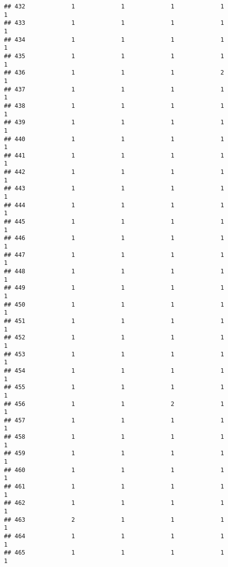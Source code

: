 \documentclass[
]{article}
\begin{document}
\begin{verbatim}
## 432             1             1             1             1             1
## 433             1             1             1             1             1
## 434             1             1             1             1             1
## 435             1             1             1             1             1
## 436             1             1             1             2             1
## 437             1             1             1             1             1
## 438             1             1             1             1             1
## 439             1             1             1             1             1
## 440             1             1             1             1             1
## 441             1             1             1             1             1
## 442             1             1             1             1             1
## 443             1             1             1             1             1
## 444             1             1             1             1             1
## 445             1             1             1             1             1
## 446             1             1             1             1             1
## 447             1             1             1             1             1
## 448             1             1             1             1             1
## 449             1             1             1             1             1
## 450             1             1             1             1             1
## 451             1             1             1             1             1
## 452             1             1             1             1             1
## 453             1             1             1             1             1
## 454             1             1             1             1             1
## 455             1             1             1             1             1
## 456             1             1             2             1             1
## 457             1             1             1             1             1
## 458             1             1             1             1             1
## 459             1             1             1             1             1
## 460             1             1             1             1             1
## 461             1             1             1             1             1
## 462             1             1             1             1             1
## 463             2             1             1             1             1
## 464             1             1             1             1             1
## 465             1             1             1             1             1

\end{verbatim}
\end{document}
